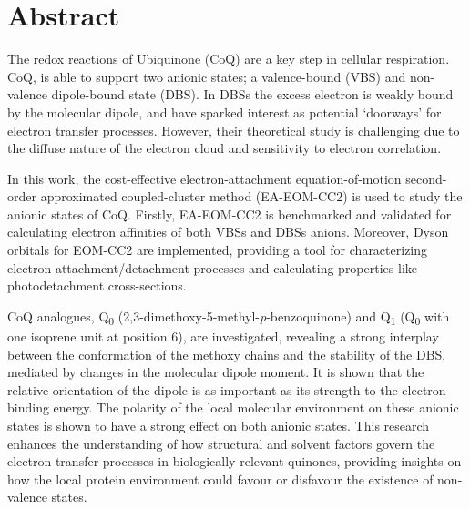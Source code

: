 \chapter*{Abstract}                                 \label{ch:abstract}


The redox reactions of Ubiquinone (CoQ) are a key step in cellular respiration. CoQ, is able to support two anionic states; a valence-bound (VBS) and non-valence dipole-bound state (DBS). In DBSs the excess electron is weakly bound by the molecular dipole, and have sparked interest as potential `doorways' for electron transfer processes. However, their theoretical study is challenging due to the diffuse nature of the electron cloud and sensitivity to electron correlation.

In this work, the cost-effective electron-attachment equation-of-motion second-order approximated coupled-cluster method (EA-EOM-CC2) is used to study the anionic states of CoQ. Firstly, EA-EOM-CC2 is benchmarked and validated for calculating electron affinities of both VBSs and DBSs anions. Moreover, Dyson orbitals for EOM-CC2 are implemented, providing a tool for characterizing electron attachment/detachment processes and calculating properties like photodetachment cross-sections.

CoQ analogues, Q\textsubscript{0} (2,3-dimethoxy-5-methyl-\textit{p}-benzoquinone) and Q\textsubscript{1} (Q\textsubscript{0} with one isoprene unit at position 6), are investigated, revealing a strong interplay between the conformation of the methoxy chains and the stability of the DBS, mediated by changes in the molecular dipole moment. It is shown that the relative orientation of the dipole is as important as its strength to the electron binding energy. The polarity of the local molecular environment on these anionic states is shown to have a strong effect on both anionic states. This research enhances the understanding of how structural and solvent factors govern the electron transfer processes in biologically relevant quinones, providing insights on how the local protein environment could favour or disfavour the existence of non-valence states.

\cleardoublepage

